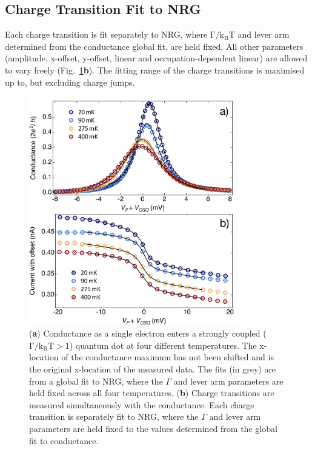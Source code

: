 \subsection{Charge Transition Fit to NRG}
Each charge transition is fit separately to NRG, where $\mathrm{\Gamma/k_BT}$ and lever arm determined from the conductance global fit, are held fixed. All other parameters (amplitude, x-offset, y-offset, linear and occupation-dependent linear) are allowed to vary freely (Fig.~\ref{fig:ch3/cond_ct_gf}\textbf{b}). The fitting range of the charge transitions is maximised up to, but excluding charge jumps.


\begin{figure}[H]
 \begin{center}
 \includegraphics[width=0.85\textwidth]{figures/ch3/figure13.pdf}
 \caption[Fit Conductance and Charge Transition to NRG]{\label{fig:ch3/cond_ct_gf} 
 (\textbf{a}) Conductance as a single electron enters a strongly coupled ($\mathrm{\Gamma/k_BT > 1}$) quantum dot at four different temperatures. The x-location of the conductance maximum has not been shifted and is the original x-location of the measured data. The fits (in grey) are from a global fit to NRG, where the $\Gamma$ and lever arm parameters are held fixed across all four temperatures. (\textbf{b}) Charge transitions are measured simultaneously with the conductance. Each charge transition is separately fit to NRG, where the $\Gamma$ and lever arm parameters are held fixed to the values determined from the global fit to conductance.}
 \end{center}
\end{figure}



